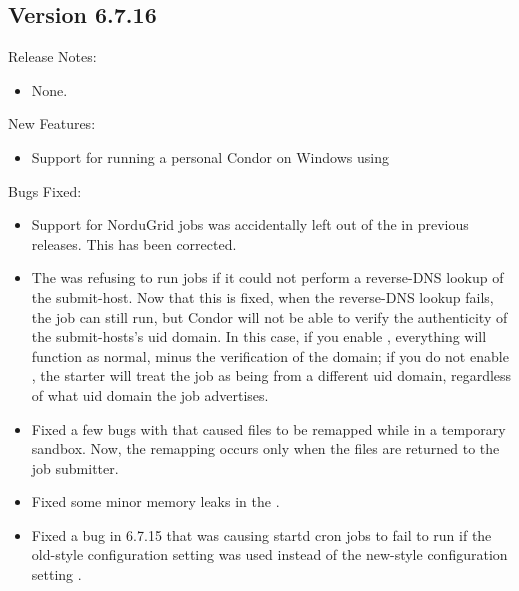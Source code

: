 \subsection*{\label{sec:New-6-7.16}Version 6.7.16}

\noindent Release Notes:

\begin{itemize}

\item None.

\end{itemize}


\noindent New Features:

\begin{itemize}

\item Support for running a personal Condor on Windows using
 

\end{itemize}

\noindent Bugs Fixed:

\begin{itemize}

\item Support for NorduGrid jobs was accidentally left out of the
 in previous releases. This has been corrected.

\item The  was refusing to run jobs if it could not
perform a reverse-DNS lookup of the submit-host.  Now that this is
fixed, when the reverse-DNS lookup fails, the job can still run, but
Condor will not be able to verify the authenticity of the
submit-hosts's uid domain.  In this case, if you enable
, everything will function as normal, minus
the verification of the domain; if you do not enable
, the starter will treat the job as being
from a different uid domain, regardless of what uid domain the job
advertises.

\item Fixed a few bugs with  that caused
files to be remapped while in a temporary sandbox. Now, the remapping
occurs only when the files are returned to the job submitter.

\item Fixed some minor memory leaks in the .

\item Fixed a bug in 6.7.15 that was causing startd cron jobs to fail to run
if the old-style configuration setting  was used
instead of the new-style configuration setting .

\end{itemize}

